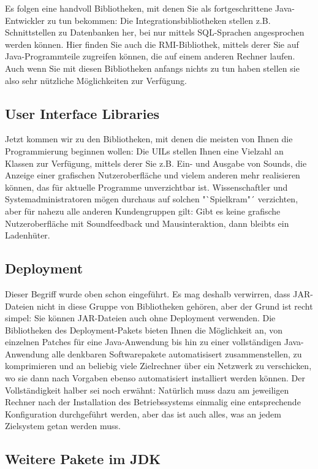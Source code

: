 Es folgen eine handvoll Bibliotheken, mit denen Sie als fortgeschrittene Java-Entwickler zu tun bekommen: Die Integrationsbibliotheken stellen z.B. Schnittstellen zu Datenbanken her, bei nur mittels SQL-Sprachen angesprochen werden können. Hier finden Sie auch die RMI-Bibliothek, mittels derer Sie auf Java-Programmteile zugreifen können, die auf einem anderen Rechner laufen. Auch wenn Sie mit diesen Bibliotheken anfangs nichts zu tun haben stellen sie also sehr nützliche Möglichkeiten zur Verfügung.

\subsection{User Interface Libraries}

Jetzt kommen wir zu den Bibliotheken, mit denen die meisten von Ihnen die Programmierung beginnen wollen: Die UILs stellen Ihnen eine Vielzahl an Klassen zur Verfügung, mittels derer Sie z.B. Ein- und Ausgabe von Sounds, die Anzeige einer grafischen Nutzeroberfläche und vielem anderen mehr realisieren können, das für aktuelle Programme unverzichtbar ist. Wissenschaftler und Systemadministratoren mögen durchaus auf solchen "`Spielkram"´ verzichten, aber für nahezu alle anderen Kundengruppen gilt: Gibt es keine grafische Nutzeroberfläche mit Soundfeedback und Mausinteraktion, dann bleibts ein Ladenhüter.

\subsection{Deployment}

Dieser Begriff wurde oben schon eingeführt. Es mag deshalb verwirren, dass JAR-Dateien nicht in diese Gruppe von Bibliotheken gehören, aber der Grund ist recht simpel: Sie können JAR-Dateien auch ohne Deployment verwenden. Die Bibliotheken des Deployment-Pakets bieten Ihnen die Möglichkeit an, von einzelnen Patches für eine Java-Anwendung bis hin zu einer vollständigen Java-Anwendung alle denkbaren Softwarepakete automatisisert zusammenstellen, zu komprimieren und an beliebig viele Zielrechner über ein Netzwerk zu verschicken, wo sie dann nach Vorgaben ebenso automatisiert installiert werden können. Der Vollständigkeit halber sei noch erwähnt: Natürlich muss dazu am jeweiligen Rechner nach der Installation des Betriebssystems einmalig eine entsprechende Konfiguration durchgeführt werden, aber das ist auch alles, was an jedem Zielsystem getan werden muss.

\subsection{Weitere Pakete im JDK}

